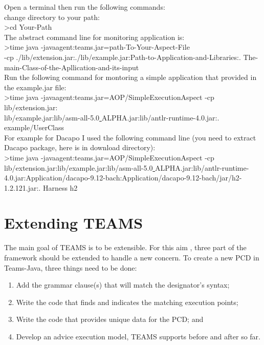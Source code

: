 \documentclass{report}
\begin{document}
Open a terminal then run the following commands:\\
change directory to your path:\\
	\textgreater cd Your-Path  \\
The abstract command line for monitoring application is:\\
\textgreater time java -javaagent:teams.jar=path-To-Your-Aspect-File\\
	 -cp ./lib/extension.jar:./lib/example.jar:Path-to-Application-and-Libraries:. The-main-Class-of-the-Apllication-and-its-input\\	
Run the following command for montoring a simple application that provided in the example.jar file:\\
\textgreater time java -javaagent:teams.jar=AOP/SimpleExecutionAspect -cp lib/extension.jar:\\lib/example.jar:lib/asm-all-5.0\underline{ }ALPHA.jar:lib/antlr-runtime-4.0.jar:. example/UserClass \\

For example for Dacapo I used the following command line (you need to extract Dacapo package, here is in download directory):\\
	\textgreater time java -javaagent:teams.jar=AOP/SimpleExecutionAspect -cp lib/extension.jar:lib/example.jar:lib/asm-all-5.0\underline{ }ALPHA.jar:lib/antlr-runtime-4.0.jar:Application/dacapo-9.12-bach:Application/dacapo-9.12-bach/jar/h2-1.2.121.jar:. Harness h2
	

\section{Extending T{\small EAMS}}
The main goal of T{\small EAMS} is to be extensible. For this aim , three part of the framework should be extended to handle a new concern. To create a new PCD in Teams-Java, three things need to be done:
\begin{enumerate}
\item Add the grammar clause(s) that will match the designator's syntax;
\item Write the code that finds and indicates the matching execution points;
\item Write the code that provides unique data for the PCD; and
\item Develop an advice execution model, TEAMS supports before and after so far.
\end{enumerate}
\end{document}
